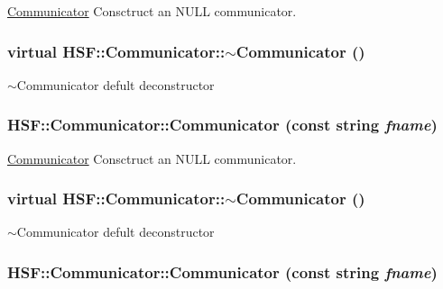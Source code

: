 \hyperlink{classHSF_1_1Communicator}{Communicator} Consctruct an NULL communicator. \hypertarget{classHSF_1_1Communicator_a3cd6eb9e85605b89e7763246aac70bb0}{
\subsubsection[{$\sim$Communicator}]{\setlength{\rightskip}{0pt plus 5cm}virtual HSF::Communicator::$\sim$Communicator ()}}
\label{classHSF_1_1Communicator_a3cd6eb9e85605b89e7763246aac70bb0}


$\sim$Communicator defult deconstructor \hypertarget{classHSF_1_1Communicator_a3d860a8bbf699d64805747144fc4e53b}{
\subsubsection[{Communicator}]{\setlength{\rightskip}{0pt plus 5cm}HSF::Communicator::Communicator (const string {\em fname})}}
\label{classHSF_1_1Communicator_a3d860a8bbf699d64805747144fc4e53b}


\hyperlink{classHSF_1_1Communicator}{Communicator} Consctruct an NULL communicator. \hypertarget{classHSF_1_1Communicator_a3cd6eb9e85605b89e7763246aac70bb0}{
\subsubsection[{$\sim$Communicator}]{\setlength{\rightskip}{0pt plus 5cm}virtual HSF::Communicator::$\sim$Communicator ()}}
\label{classHSF_1_1Communicator_a3cd6eb9e85605b89e7763246aac70bb0}


$\sim$Communicator defult deconstructor \hypertarget{classHSF_1_1Communicator_a3d860a8bbf699d64805747144fc4e53b}{
\subsubsection[{Communicator}]{\setlength{\rightskip}{0pt plus 5cm}HSF::Communicator::Communicator (const string {\em fname})}}
\label{classHSF_1_1Communicator_a3d860a8bbf699d64805747144fc4e53b}


